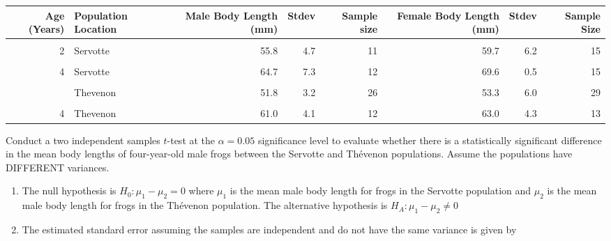 \documentclass[
]{article}
\begin{document}
\begin{table}[H]
\centering\centering
\begin{tabular}{rlrrrrrr}
\toprule
Age (Years) & Population Location & Male Body Length (mm) & Stdev & Sample size & Female Body Length (mm) & Stdev & Sample Size\\
\midrule
\cellcolor{gray!10}{1} & \cellcolor{gray!10}{Servotte} & \cellcolor{gray!10}{32.5} & \cellcolor{gray!10}{5.3} & \cellcolor{gray!10}{45} & \cellcolor{gray!10}{33.4} & \cellcolor{gray!10}{5.4} & \cellcolor{gray!10}{76}\\
2 & Servotte & 55.8 & 4.7 & 11 & 59.7 & 6.2 & 15\\
\cellcolor{gray!10}{3} & \cellcolor{gray!10}{Servotte} & \cellcolor{gray!10}{61.2} & \cellcolor{gray!10}{5.3} & \cellcolor{gray!10}{35} & \cellcolor{gray!10}{65.6} & \cellcolor{gray!10}{5.2} & \cellcolor{gray!10}{27}\\
4 & Servotte & 64.7 & 7.3 & 12 & 69.6 & 0.5 & 15\\
\cellcolor{gray!10}{1} & \cellcolor{gray!10}{Thevenon} & \cellcolor{gray!10}{32.9} & \cellcolor{gray!10}{3.9} & \cellcolor{gray!10}{49} & \cellcolor{gray!10}{32.8} & \cellcolor{gray!10}{4.3} & \cellcolor{gray!10}{76}\\
\addlinespace
2 & Thevenon & 51.8 & 3.2 & 26 & 53.3 & 6.0 & 29\\
\cellcolor{gray!10}{3} & \cellcolor{gray!10}{Thevenon} & \cellcolor{gray!10}{59.9} & \cellcolor{gray!10}{5.4} & \cellcolor{gray!10}{27} & \cellcolor{gray!10}{59.9} & \cellcolor{gray!10}{6.4} & \cellcolor{gray!10}{21}\\
4 & Thevenon & 61.0 & 4.1 & 12 & 63.0 & 4.3 & 13\\
\bottomrule
\end{tabular}
\end{table}

Conduct a two independent samples \(t\)-test at the \(\alpha = 0.05\)
significance level to evaluate whether there is a statistically
significant difference in the mean body lengths of four-year-old male
frogs between the Servotte and Thévenon populations. Assume the
populations have DIFFERENT variances.

\begin{enumerate}
\def\labelenumi{\arabic{enumi}.}
\item
  {The null hypothesis is \(H_0: \mu_1 - \mu_2 = 0\) where \(\mu_1\) is
  the mean male body length for frogs in the Servotte population and
  \(\mu_2\) is the mean male body length for frogs in the Thévenon
  population. The alternative hypothesis is
  \(H_A: \mu_1 - \mu_2 \neq 0\)}
\item
  The estimated standard error assuming the samples are independent and
  do not have the same variance is given by
\end{enumerate}
\end{document}

